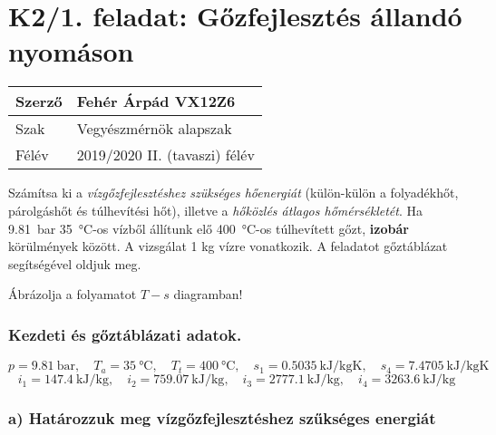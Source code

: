 \section*{K2/1. feladat: Gőzfejlesztés állandó nyomáson}

\begin{tabular}{ | p{2cm} | p{14cm} | } 
	\hline
	Szerző & Fehér Árpád VX12Z6 \\ 
	\hline
	Szak & Vegyészmérnök alapszak \\ 
	\hline
	Félév & 2019/2020 II. (tavaszi) félév \\ 
	\hline
\end{tabular}
\vspace{0.5cm}

\noindent Számítsa ki a \textit{vízgőzfejlesztéshez szükséges hőenergiát} (külön-külön a folyadékhőt, párolgáshőt és túlhevítési hőt), illetve a \textit{hőközlés átlagos hőmérsékletét}. Ha \SI{9,81}{\bar} \SI{35}{\celsius}-os vízből állítunk elő \SI{400}{\celsius}-os túlhevített gőzt, \textbf{izobár} körülmények között. A vizsgálat 1 kg vízre vonatkozik. A feladatot gőztáblázat segítségével oldjuk meg.

\vspace{2mm}
\noindent Ábrázolja a folyamatot $T-s$ diagramban!

\subsubsection{Kezdeti és gőztáblázati adatok.}
\begin{equation*}
p = \SI{9,81}{\bar}, 
\quad 
T_a = \SI{35}{\celsius}, 
\quad
T_t = \SI{400}{\celsius},
\quad
s_1 = \SI{0,5035}{\kilo\joule\per\kilogram\kelvin},
\quad
s_4 = \SI{7,4705}{\kilo\joule\per\kilogram\kelvin}
\end{equation*}
\begin{equation*}
i_1 = \SI{147,4}{\kilo\joule\per\kilogram},
\quad
i_2 = \SI{759,07}{\kilo\joule\per\kilogram},
\quad
i_3 = \SI{2777,1}{\kilo\joule\per\kilogram},
\quad
i_4 = \SI{3263,6}{\kilo\joule\per\kilogram}
\end{equation*}

\noindent\hrulefill

\subsubsection*{a) Határozzuk meg vízgőzfejlesztéshez szűkséges energiát}

